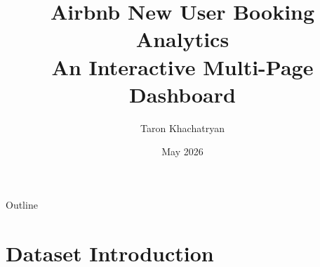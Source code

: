 \documentclass[aspectratio=169]{beamer}
\title[Airbnb Analytics Dashboard]{Airbnb New User Booking Analytics\\[4pt]
       \large An Interactive Multi-Page Dashboard}
\author{Taron Khachatryan}
\institute{Data Visualisation — Final Project}
\date{May 2026}
\begin{document}

\begin{frame}
  \titlepage
\end{frame}

\begin{frame}{Outline}
  \tableofcontents
\end{frame}

\section{Dataset Introduction}
\end{document}
